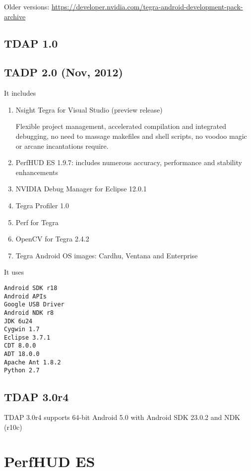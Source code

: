 Older versions:
\url{https://developer.nvidia.com/tegra-android-development-pack-archive}

\subsection{TDAP 1.0}

\subsection{TADP 2.0 (Nov, 2012)}

It includes
\begin{enumerate}
  \item Nsight Tegra for Visual Studio (preview release)
  
  Flexible project management, accelerated compilation and integrated debugging,
  no need to massage makefiles and shell scripts, no voodoo magic or arcane
  incantations require.
  
  \item PerfHUD ES 1.9.7: includes numerous accuracy, performance and stability
  enhancements
  
  \item NVIDIA Debug Manager for Eclipse 12.0.1
  
  \item Tegra Profiler 1.0
  \item Perf for Tegra
  \item OpenCV for Tegra 2.4.2
  \item Tegra Android OS images: Cardhu, Ventana and Enterprise
\end{enumerate}

It uses
\begin{verbatim}
Android SDK r18
Android APIs
Google USB Driver
Android NDK r8
JDK 6u24
Cygwin 1.7
Eclipse 3.7.1
CDT 8.0.0
ADT 18.0.0
Apache Ant 1.8.2
Python 2.7
\end{verbatim}

\subsection{TDAP 3.0r4}

TDAP 3.0r4 supports 64-bit Android 5.0 with Android SDK 23.0.2 and NDK (r10c)


\section{PerfHUD ES} 


